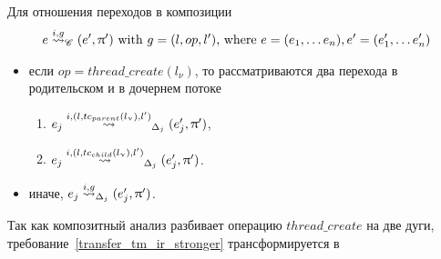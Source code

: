 Для отношения переходов в композиции
\begin{equation}
\label{composite_transfer_eq}
\begin{aligned}
e \stackrel{i,g}{\leadsto}_{\mathscr{C}} (e',\uppi') \mbox{ with } g=(l,op,l' )\mbox{, where } e = (e_1, \dots e_n), e' = (e_1', \dots e_n')
\end{aligned}
\end{equation} 

\begin{itemize}
\item если $op=thread\_create(l_\nu)$, то рассматриваются два перехода в родительском и в дочернем потоке
\begin{enumerate}
\item $e_j \stackrel{i,(l,tc_{parent}(l_\upnu),l')}{\leadsto}_{\Delta_j} (e_j',\uppi')$,
\item $e_j \stackrel{i,(l,tc_{child}(l_\upnu),l')}{\leadsto}_{\Delta_j} (e_j',\uppi')$.
\end{enumerate}
\item иначе, $e_j \stackrel{i,g}{\leadsto}_{\Delta_j} (e_j',\uppi')$.
\end{itemize}


Так как композитный анализ разбивает операцию $thread\_create$ на две дуги, требование~\ref{transfer_tm_ir_stronger} трансформируется в

